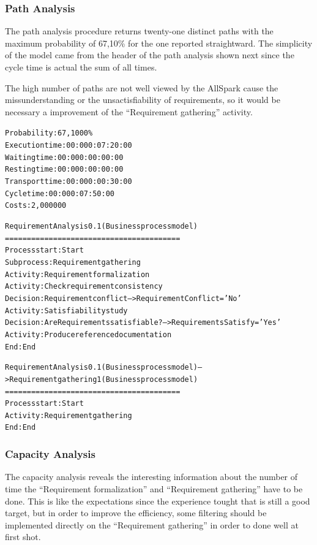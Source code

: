 \subsubsection{Path Analysis}
The path analysis procedure returns twenty-one distinct paths with the maximum probability of 67,10\% for the one reported straightward. The simplicity of the model came from the header of the path analysis shown next since the cycle time is actual the sum of all times.

The high number of paths are not well viewed by the AllSpark cause the missunderstanding or the unsactisfiability of requirements, so it would be necessary a improvement of the ``Requirement gathering'' activity.

\begin{alltt}
Probability:   67,1000\%
Execution time:  00:000:07:20:00
Waiting time:  00:000:00:00:00
Resting time:  00:000:00:00:00
Transport time:  00:000:00:30:00
Cycle time:  00:000:07:50:00
Costs:  2,000000

Requirement Analysis 0.1 (Business process model)
========================================
Process start: Start
Subprocess: Requirement gathering
Activity: Requirement formalization
Activity: Check requirement consistency
Decision: Requirement conflict --> RequirementConflict = 'No'
Activity: Satisfiability study
Decision: Are Requirements satisfiable? --> RequirementsSatisfy = 'Yes'
Activity: Produce reference documentation
End: End

Requirement Analysis 0.1 (Business process model) --> Requirement gathering 1 (Business process model)
========================================
Process start: Start
Activity: Requirement gathering
End: End
\end{alltt}


\subsubsection{Capacity Analysis}
The capacity analysis reveals the interesting information about the number of time the ``Requirement formalization'' and ``Requirement gathering'' have to be done. This is like the expectations since the experience tought that is still a good target, but in order to improve the efficiency, some filtering should be implemented directly on the ``Requirement gathering'' in order to done well at first shot.

